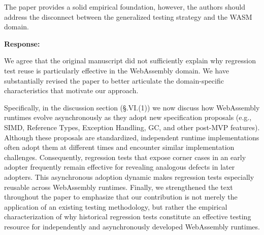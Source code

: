\documentclass[11pt]{article}
\newenvironment{response}{%
    \par\vspace{10pt}
    \par\noindent\textbf{\color{tseblue}Response:}\par\nobreak\ignorespaces
}{%
    \par\vspace{15pt}
}
\newcounter{reviewernum}
\newcounter{cmtcounter}[reviewernum]
\newenvironment{rcomment}{%
    \stepcounter{cmtcounter}%
    \begin{revcomment}[R\thereviewernum{}.C\thecmtcounter{}.~Reviewer~\thereviewernum{}, Comment~\thecmtcounter]
}{%
    \end{revcomment}
}
\begin{document}
\begin{rcomment}
    The paper provides a solid empirical foundation, however, the authors should address the disconnect between the generalized testing strategy and the WASM domain.
\end{rcomment}
\begin{response}
    We agree that the original manuscript did not sufficiently explain why regression test reuse is particularly effective in the WebAssembly domain. We have substantially revised the paper to better articulate the domain-specific characteristics that motivate our approach.
    
    Specifically, in the discussion section (§.VI.(1)) we now discuss how WebAssembly runtimes evolve asynchronously as they adopt new specification proposals (e.g., SIMD, Reference Types, Exception Handling, GC, and other post-MVP features). Although these proposals are standardized, independent runtime implementations often adopt them at different times and encounter similar implementation challenges. Consequently, regression tests that expose corner cases in an early adopter frequently remain effective for revealing analogous defects in later adopters. This asynchronous adoption dynamic makes regression tests especially reusable across WebAssembly runtimes.
Finally, we strengthened the text throughout the paper to emphasize that our contribution is not merely the application of an existing testing methodology, but rather the empirical characterization of why historical regression tests constitute an effective testing resource for independently and asynchronously developed WebAssembly runtimes.

\end{response}
\end{document}
